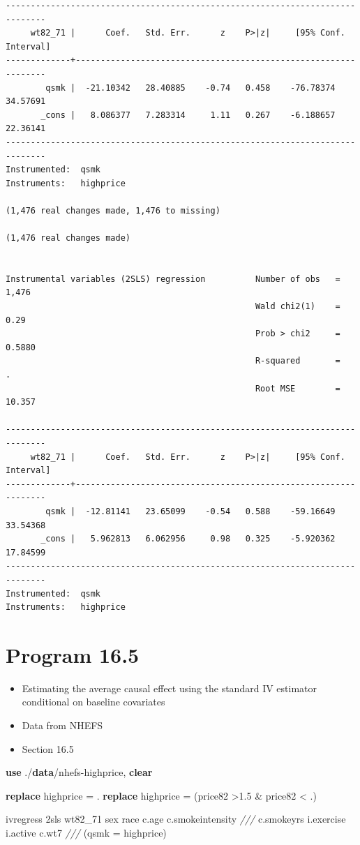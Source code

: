 \documentclass[
  10pt,
]{book}
\newenvironment{Shaded}{\begin{snugshade}}{\end{snugshade}}
\newcommand{\CommentTok}[1]{\textcolor[rgb]{0.56,0.35,0.01}{\textit{#1}}}
\newcommand{\KeywordTok}[1]{\textcolor[rgb]{0.13,0.29,0.53}{\textbf{#1}}}
\newcommand{\NormalTok}[1]{#1}
\providecommand{\tightlist}{%
  \setlength{\itemsep}{0pt}\setlength{\parskip}{0pt}}
\begin{document}
\begin{verbatim}
------------------------------------------------------------------------------
     wt82_71 |      Coef.   Std. Err.      z    P>|z|     [95% Conf. Interval]
-------------+----------------------------------------------------------------
        qsmk |  -21.10342   28.40885    -0.74   0.458    -76.78374    34.57691
       _cons |   8.086377   7.283314     1.11   0.267    -6.188657    22.36141
------------------------------------------------------------------------------
Instrumented:  qsmk
Instruments:   highprice

(1,476 real changes made, 1,476 to missing)

(1,476 real changes made)


Instrumental variables (2SLS) regression          Number of obs   =      1,476
                                                  Wald chi2(1)    =       0.29
                                                  Prob > chi2     =     0.5880
                                                  R-squared       =          .
                                                  Root MSE        =     10.357

------------------------------------------------------------------------------
     wt82_71 |      Coef.   Std. Err.      z    P>|z|     [95% Conf. Interval]
-------------+----------------------------------------------------------------
        qsmk |  -12.81141   23.65099    -0.54   0.588    -59.16649    33.54368
       _cons |   5.962813   6.062956     0.98   0.325    -5.920362    17.84599
------------------------------------------------------------------------------
Instrumented:  qsmk
Instruments:   highprice
\end{verbatim}

\hypertarget{program-16.5-1}{%
\section{Program 16.5}\label{program-16.5-1}}

\begin{itemize}
\tightlist
\item
  Estimating the average causal effect using the standard IV estimator conditional on baseline covariates
\item
  Data from NHEFS
\item
  Section 16.5
\end{itemize}

\begin{Shaded}
\begin{Highlighting}[]
\KeywordTok{use}\NormalTok{ ./}\KeywordTok{data}\NormalTok{/nhefs{-}highprice, }\KeywordTok{clear}

\KeywordTok{replace}\NormalTok{ highprice = .}
\KeywordTok{replace}\NormalTok{ highprice = (price82 \textgreater{}1.5 \& price82 \textless{} .)}

\NormalTok{ivregress 2sls wt82\_71 sex race c.age c.smokeintensity }\CommentTok{///}
\NormalTok{  c.smokeyrs i.exercise i.active c.wt7 }\CommentTok{///}
\NormalTok{  (qsmk = highprice)}
\end{Highlighting}
\end{Shaded}
\end{document}
